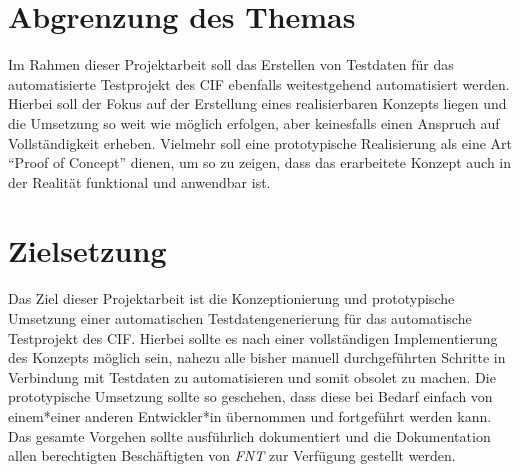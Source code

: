 \section{Abgrenzung des Themas}\label{sec:abgrenzung}
Im Rahmen dieser Projektarbeit soll das Erstellen von Testdaten für das automatisierte Testprojekt des \ac{CIF} ebenfalls weitestgehend automatisiert werden. Hierbei soll der Fokus auf der Erstellung eines realisierbaren Konzepts liegen und die Umsetzung so weit wie möglich erfolgen, aber keinesfalls einen Anspruch auf Vollständigkeit erheben. Vielmehr soll eine prototypische Realisierung als eine Art \enquote{Proof of Concept} dienen, um so zu zeigen, dass das erarbeitete Konzept auch in der Realität funktional und anwendbar ist. \cite{oed:2021}

\section{Zielsetzung}\label{sec:zielsetzung}
Das Ziel dieser Projektarbeit ist die Konzeptionierung und prototypische Umsetzung einer automatischen Testdatengenerierung für das automatische Testprojekt des \ac{CIF}. Hierbei sollte es nach einer vollständigen Implementierung des Konzepts möglich sein, nahezu alle bisher manuell durchgeführten Schritte in Verbindung mit Testdaten zu automatisieren und somit obsolet zu machen. Die prototypische Umsetzung sollte so geschehen, dass diese bei Bedarf einfach von einem*einer anderen Entwickler*in übernommen und fortgeführt werden kann. Das gesamte Vorgehen sollte ausführlich dokumentiert und die Dokumentation allen berechtigten Beschäftigten von \textit{FNT} zur Verfügung gestellt werden.
